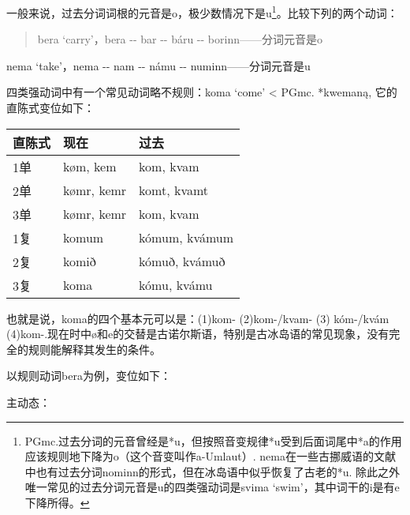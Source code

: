 一般来说，过去分词词根的元音是o，极少数情况下是u\footnote{PGmc.过去分词的元音曾经是*u，但按照音变规律*u受到后面词尾中*a的作用应该规则地下降为o（这个音变叫作a-Umlaut）.
  nema在一些古挪威语的文献中也有过去分词nominn的形式，但在冰岛语中似乎恢复了古老的*u.
  除此之外唯一常见的过去分词元音是u的四类强动词是svima
  `swim'，其中词干的i是有e下降所得。}。比较下列的两个动词：

\begin{quote}
  bera `carry‌'，bera -\/- bar -\/- báru -\/- borinn------分词元音是o
\end{quote}

nema `take‌'，nema -\/- nam -\/- námu -\/- numinn------分词元音是u

四类强动词中有一个常见动词略不规则：koma `come' \textless{} PGmc.
*kwemaną, 它的直陈式变位如下：

\begin{longtable}{lll}
  \toprule
  直陈式 & 现在         & 过去            \\
  \midrule
  \endhead
  \bottomrule
  \endfoot
  1单  & køm, kem   & kom, kvam     \\
  2单  & kømr, kemr & komt, kvamt   \\
  3单  & kømr, kemr & kom, kvam     \\
  1复  & komum      & kómum, kvámum \\
  2复  & komið      & kómuð, kvámuð \\
  3复  & koma       & kómu, kvámu   \\
\end{longtable}

也就是说，koma的四个基本元可以是：(1)kom- (2)kom-/kvam- (3) kóm-/kvám
(4)kom-.现在时中ø和e的交替是古诺尔斯语，特别是古冰岛语的常见现象，没有完全的规则能解释其发生的条件。

以规则动词bera为例，变位如下：

主动态：

